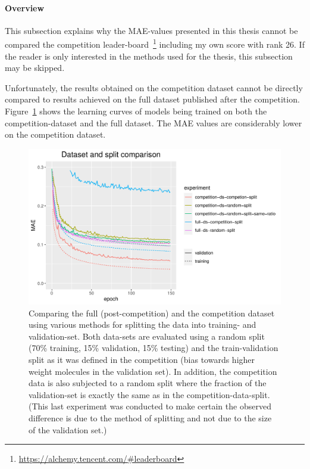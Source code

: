 \paragraph{Overview} This subsection explains why the MAE-values presented in this thesis cannot be compared the competition leader-board~\footnote{\url{https://alchemy.tencent.com/\#leaderboard}} including my own score with rank 26. If the reader is only interested in the methods used for the thesis, this subsection may be skipped.

Unfortunately, the results obtained on the competition dataset cannot be directly compared to results achieved on the full dataset published after the competition. Figure~\ref{fig:competition-vs-full-ds} shows the learning curves of models being trained on both the competition-dataset and the full dataset. The MAE values are considerably lower on the competition dataset.


\begin{figure}[H]
	\includegraphics[width=\linewidth]{figures/competition-vs-full-ds}
	\caption{Comparing the full (post-competition) and the competition dataset using various methods for splitting the data into training- and validation-set. Both data-sets are evaluated using a random split (70\% training, 15\% validation, 15\% testing) and the train-validation split as it was defined in the competition (bias towards higher weight molecules in the validation set). In addition, the competition data is also subjected to a random split where the fraction of the validation-set is exactly the same as in the competition-data-split. (This last experiment was conducted to make certain the observed difference is due to the method of splitting and not due to the size of the validation set.)}
	\label{fig:competition-vs-full-ds}
\end{figure}

